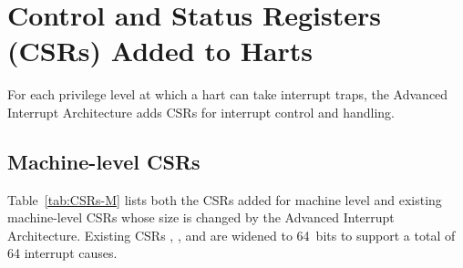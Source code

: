 
\chapter{Control and Status Registers (CSRs) Added to Harts}
\label{ch:CSRs}

For each privilege level at which a {\RISCV} hart can take interrupt
traps, the Advanced Interrupt Architecture adds CSRs for interrupt
control and handling.

\section{Machine-level CSRs}

Table~\ref{tab:CSRs-M} lists both the CSRs added for machine level
and existing machine-level CSRs whose size is changed
by the Advanced Interrupt Architecture.
Existing CSRs , , and  are
widened to 64~bits to support a total of 64 interrupt causes.

